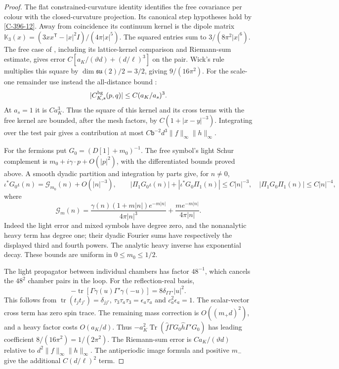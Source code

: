 \documentclass[11pt,letterpaper,reqno]{amsart}
\theoremstyle{definition}
\theoremstyle{remark}
\begin{document}
\begin{proof}
The flat constrained-curvature identity
\cite[Proposition~120.3]{YMM1} identifies the free covariance
per colour with the closed-curvature projection. Its canonical
step hypotheses hold by \cref{C-396-12}. Away from coincidence its continuum kernel is the
dipole matrix
$\mathbb K_3(x)=(3xx^{\mathsf T}-|x|^2I)/(4\pi|x|^5)$.
The squared entries sum to $3/(8\pi^2|x|^6)$.
The free case of \cite[Proposition~121.2]{YMM1}, including
its lattice-kernel comparison and Riemann-sum estimate, gives error $C[a_K/(\vartheta d)+(d/\ell)^3]$ on the pair.
Wick's rule multiplies this square by $\dim\mathfrak{su}(2)/2=3/2$,
giving $9/(16\pi^2)$.
For the scale-one remainder use instead the all-distance bound
\cite[Proposition~120.5]{YMM1}:
\[
 |C^{\rm bg}_{K,s}(p,q)|\le C(a_K/a_s)^3.
\]
At $a_s=1$ it is $Ca_K^3$. Thus the square of this kernel
and its cross terms with the free kernel are bounded, after
the mesh factors, by $C(1+|x-y|^{-3})$. Integrating over
the test pair gives a contribution at most
$C\mathsf b^{-2}d^3\|f\|_\infty\|h\|_\infty$.

For the fermions put $G_0=(D[1]+m_0)^{-1}$.
The free symbol's light Schur complement is
$m_0+i\gamma\cdot p+O(|p|^2)$, with the differentiated bounds
proved above. A smooth dyadic partition and integration by parts
give, for $n\ne0$,
\[
 \iota^*G_0\iota(n)=\mathscr G_{m_0}(n)+O(|n|^{-3}),\qquad
 |\Pi_1G_0\iota(n)|+|\iota^*G_0\Pi_1(n)|\le C|n|^{-3},
 \quad |\Pi_1G_0\Pi_1(n)|\le C|n|^{-4},
\]
where
\[
 \mathscr G_m(n)=\frac{\gamma(n)(1+m|n|)e^{-m|n|}}{4\pi|n|^3}
                          +\frac{m e^{-m|n|}}{4\pi|n|}.
\]
Indeed the light error and mixed symbols have degree zero, and
the nonanalytic heavy term has degree one; their dyadic Fourier
sums have respectively the displayed third and fourth powers.
The analytic heavy inverse has exponential decay. These bounds
are uniform in $0\le m_0\le1/2$.

The light propagator between individual chambers has factor
$48^{-1}$, which cancels the $48^2$ chamber pairs in the loop.
For the reflection-real basis,
\[
 -\operatorname{tr}[\Gamma\gamma(u)\Gamma'\gamma(-u)]
                         =8\delta_{\Gamma\Gamma'}|u|^2.
\]
This follows from $\operatorname{tr}(t_jt_{j'})=\delta_{jj'}$,
$\tau_3\tau_a\tau_3=\epsilon_a\tau_a$ and $c_a^2\epsilon_a=1$.
The scalar-vector cross term has zero spin trace. The remaining
mass correction is $O((m_+d)^2)$, and a heavy factor costs
$O(a_K/d)$. Thus
$-a_K^2\operatorname{Tr}(\hat f\Gamma G_0\hat h\Gamma'G_0)$
has leading coefficient $8/(16\pi^2)=1/(2\pi^2)$.
The Riemann-sum error is $C a_K/(\vartheta d)$ relative to
$d^2\|f\|_\infty\|h\|_\infty$.
The antiperiodic image formula and positive $m_-$ give
the additional $C(d/\ell)^2$ term.


\end{proof}
\end{document}
